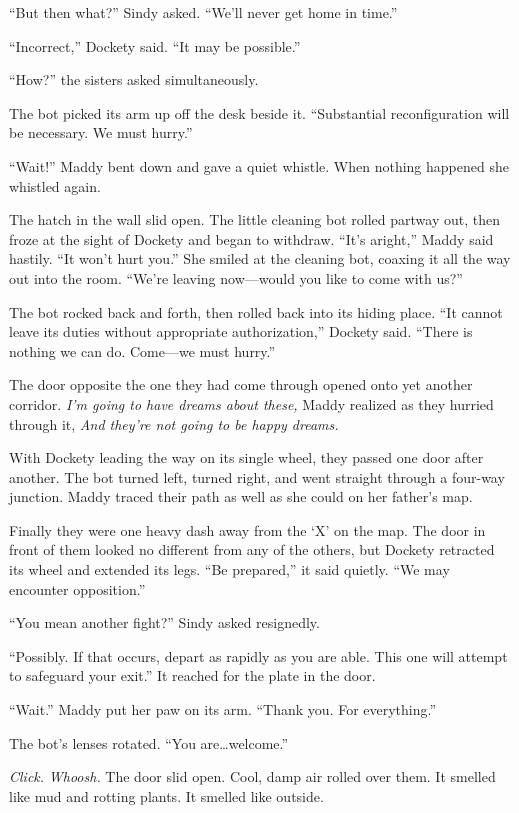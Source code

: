 \documentclass[10pt]{article}
\begin{document}
``But then what?'' Sindy asked. ``We'll never get home in time.''

``Incorrect,'' Dockety said. ``It may be possible.''

``How?'' the sisters asked simultaneously.

The bot picked its arm up off the desk beside it. ``Substantial
reconfiguration will be necessary. We must hurry.''

``Wait!'' Maddy bent down and gave a quiet whistle. When nothing
happened she whistled again.

The hatch in the wall slid open. The little cleaning bot rolled partway
out, then froze at the sight of Dockety and began to withdraw. ``It's
aright,'' Maddy said hastily. ``It won't hurt you.'' She smiled at the
cleaning bot, coaxing it all the way out into the room. ``We're leaving
now---would you like to come with us?''

The bot rocked back and forth, then rolled back into its hiding place.
``It cannot leave its duties without appropriate authorization,''
Dockety said. ``There is nothing we can do. Come---we must hurry.''

The door opposite the one they had come through opened onto yet another
corridor. \emph{I'm going to have dreams about these,} Maddy realized as
they hurried through it, \emph{And they're not going to be happy
dreams.}

With Dockety leading the way on its single wheel, they passed one door
after another. The bot turned left, turned right, and went straight
through a four-way junction. Maddy traced their path as well as she
could on her father's map.

Finally they were one heavy dash away from the `X' on the map. The door
in front of them looked no different from any of the others, but Dockety
retracted its wheel and extended its legs. ``Be prepared,'' it said
quietly. ``We may encounter opposition.''

``You mean another fight?'' Sindy asked resignedly.

``Possibly. If that occurs, depart as rapidly as you are able. This one
will attempt to safeguard your exit.'' It reached for the plate in the
door.

``Wait.'' Maddy put her paw on its arm. ``Thank you. For everything.''

The bot's lenses rotated. ``You are\ldots{}welcome.''

\emph{Click.} \emph{Whoosh.} The door slid open. Cool, damp air rolled
over them. It smelled like mud and rotting plants. It smelled like
outside.
\end{document}
